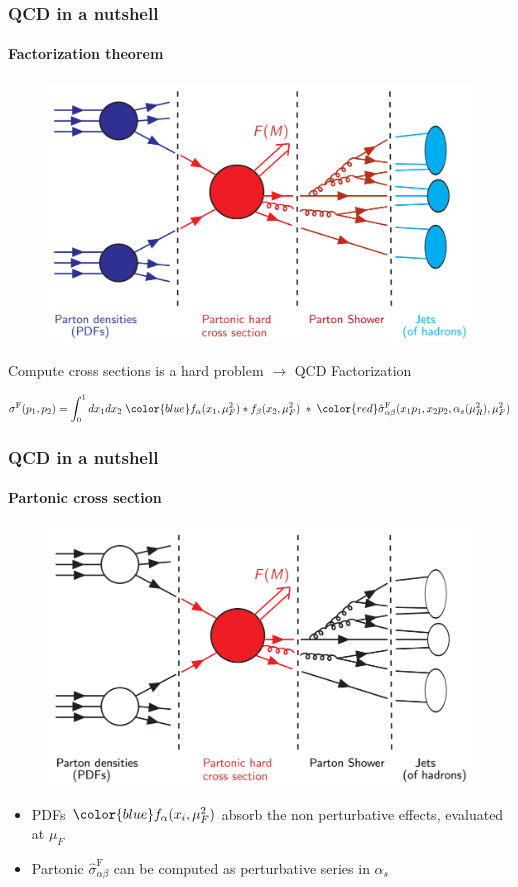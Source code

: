 \documentclass[aspectratio=43]{beamer}
\begin{document}
\begin{frame}

	\frametitle{QCD in a nutshell}
	\framesubtitle{Factorization theorem}

	\vspace{0.4 cm}
	
	\begin{figure}
		\includegraphics[width = 7 cm]{plots/factorization_1.png}
	\end{figure}
	
	Compute cross sections is a {\color{red}hard problem} $\longrightarrow$ {\color{blue} QCD Factorization}
	
	\begin{equation}
		\sigma^{\textrm{F}}(p_{1}, p_{2}) =
		\int_{0}^{1} dx_{1} dx_{2} \; {\color{blue} f_{\alpha}(x_{1}, \mu_{F}^{2}) \ast f_{\beta}(x_{2}, \mu_{F}^{2})}
		\; \ast \;  
		{\color{red}\hat{\sigma}^{\textrm{F}}_{\alpha \beta}(x_{1}p_{1}, x_{2}p_{2}, \alpha_{s}(\mu_{R}^{2}), \mu_{F}^{2})} \nonumber
	\end{equation}

\end{frame}

\begin{frame}
	
	\frametitle{QCD in a nutshell}
	\framesubtitle{Partonic cross section}
	
	\begin{figure}
		\includegraphics[width = 7 cm]{plots/factorization_2.png}
	\end{figure}
	
	\begin{itemize}
		\item {\color{blue}PDFs} ${\color{blue} f_{\alpha}(x_{i}, \mu_{F}^{2})}$ absorb the non perturbative effects, evaluated at $\mu_{F}$
		\item Partonic {\color{red}$\hat{\sigma}^{\textrm{F}}_{\alpha \beta}$} can be computed as perturbative series in $\alpha_{s}$
	\end{itemize}
	
\end{frame}
\end{document}
